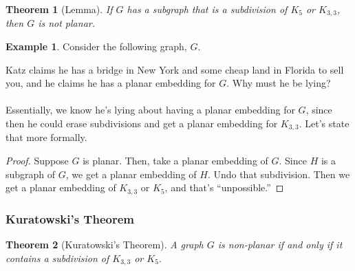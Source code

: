 \documentclass[]{article}
\newtheorem*{theorem}{Theorem}
\theoremstyle{definition}
\newtheorem{ex}{Example}[section]
\begin{document}
				\begin{theorem}[Lemma]
					If $G$ has a subgraph that is a subdivision of $K_5$ or $K_{3,3}$, then $G$ is not planar.
				\end{theorem}
				
				\begin{ex}
					Consider the following graph, $G$.
					\begin{center}
					\end{center}
					Katz claims he has a bridge in New York and some cheap land in Florida to sell you, and he claims he has a planar embedding for $G$. Why must he be lying?
					\\ \\
					Essentially, we know he's lying about having a planar embedding for $G$, since then he could erase subdivisions and get a planar embedding for $K_{3, 3}$. Let's state that more formally.
					
					\begin{proof}
						Suppose $G$ is planar. Then, take a planar embedding of $G$. Since $H$ is a subgraph of $G$, we get a planar embedding of $H$. Undo that subdivision. Then we get a planar embedding of $K_{3, 3}$ or $K_5$, and that's ``unpossible.''
					\end{proof}
				\end{ex}
			\subsubsection{Kuratowski's Theorem}
				\begin{theorem}[Kuratowski's Theorem]
					A graph $G$ is non-planar if and only if it contains a subdivision of $K_{3,3}$ or $K_5$.
				\end{theorem}
				
\end{document}
